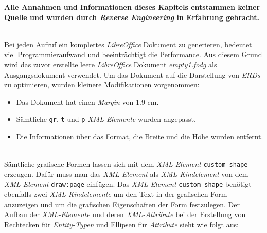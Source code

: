 
\noindent
\textbf{Alle Annahmen und Informationen dieses Kapitels entstammen keiner Quelle und wurden durch \textit{Reverse Engineering} in Erfahrung gebracht.}

\hon{}
\noindent
\\
\noindent
Bei jeden Aufruf ein komplettes \textit{LibreOffice} Dokument zu generieren, bedeutet viel Programmieraufwand und beeinträchtigt die Performance. Aus diesem Grund wird das zuvor erstellte leere \textit{LibreOffice} Dokument \textit{empty1.fodg} als Ausgangsdokument verwendet. Um das Dokument auf die Darstellung von \textit{ERDs} zu optimieren, wurden kleinere Modifikationen vorgenommen:
\begin{itemize}
	\item Das Dokument hat einen \textit{Margin} von 1.9 cm.
	\item Sämtliche \verb|gr|, \verb|t| und \verb|p| \textit{XML-Elemente} wurden angepasst. 
	\item Die Informationen über das Format, die Breite und die Höhe wurden entfernt.
\end{itemize} 
\noindent
\hon{}
\\
\noindent
Sämtliche grafische Formen lassen sich mit dem \textit{XML-Element} \verb|custom-shape| erzeugen. Dafür muss man das \textit{XML-Element} als \textit{XML-Kindelement} von dem \textit{XML-Element} \verb|draw:page| einfügen. Das \textit{XML-Element} \verb|custom-shape| benötigt ebenfalls zwei \textit{XML-Kindelemente} um den Text in der grafischen Form anzuzeigen und um die grafischen Eigenschaften der Form festzulegen. Der Aufbau der \textit{XML-Elemente} und deren \textit{XML-Attribute} bei der Erstellung von Rechtecken für \textit{Entity-Typen} und Ellipsen für \textit{Attribute} sieht wie folgt aus:

